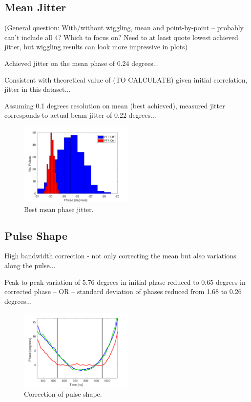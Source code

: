\documentclass[%
 reprint,
 amsmath,amssymb,
 aps,
]{revtex4-1}
\begin{document}
\subsection{\label{ss:meanJit}Mean Jitter}

(General question: With/without wiggling, mean and point-by-point -- probably can't include all 4? Which to focus on? Need to at least quote lowest achieved jitter, but wiggling results can look more impressive in plots)

Achieved jitter on the mean phase of 0.24 degrees...

Consistent with theoretical value of (TO CALCULATE) given initial correlation, jitter in this dataset...

Assuming 0.1 degrees resolution on mean (best achieved), measured jitter corresponds to actual beam jitter of 0.22 degrees...

\begin{figure}
\includegraphics[width=0.5\textwidth]{figs/BestFF_meanJit}%
\caption{\label{fig:meanJit}Best mean phase jitter.}
\end{figure}


\subsection{\label{ss:shape}Pulse Shape}

High bandwidth correction - not only correcting the mean but also variations along the pulse...

Peak-to-peak variation of 5.76 degrees in initial phase reduced to 0.65 degrees in corrected phase -- OR -- standard deviation of phases reduced from 1.68 to 0.26 degrees...

\begin{figure}
\includegraphics[width=0.5\textwidth]{figs/BestFF_shape}%
\caption{\label{fig:shape}Correction of pulse shape.}
\end{figure}
\end{document}
